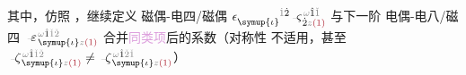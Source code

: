 其中，仿照 ，继续定义 \textcolor{NavyBlue}{磁偶-电四/磁偶} $\epsilon^{\hphantom{\symup{\iota}}\mathcolor{gray}{\dot{1}}\dot{2}}_{\symup{\iota}} \xint{\begin{smallmatrix} ~ \\ {}^{}_{\mathcolor{gray}{-}} \\ ~ \end{smallmatrix}}{13}{\varsigma}^{\;\! \mathcolor{gray}{\omega} \hat{1} \mathcolor{gray}{\check{1}}}_{\;\! \dot{2} \mathcolor{gray}{z} \textcolor{Maroon}{(1)}}$ 与下一阶 \textcolor{NavyBlue}{电偶-电八/磁四} $\xint{\begin{smallmatrix} ~ \\ {}^{}_{\mathcolor{gray}{-}} \\ ~ \end{smallmatrix}}{16}{\varepsilon}^{\;\! \mathcolor{gray}{\omega} \hat{1} \mathcolor{gray}{\check{1} \check{2}}}_{\;\! \symup{\iota} \mathcolor{gray}{z} \textcolor{Maroon}{(1)}}$ 合并\textcolor{Plum}{同类项}后的系数（对称性  不适用，甚至 $\xint{\begin{smallmatrix} ~ \\ {}^{}_{\mathcolor{gray}{-}} \\ ~ \end{smallmatrix}}{12}{\zeta}^{\;\! \mathcolor{gray}{\omega} \hat{1} \mathcolor{gray}{\check{1} \check{2}}}_{\;\! \symup{\iota} \mathcolor{gray}{z} \textcolor{Maroon}{(1)}} \neq \xint{\begin{smallmatrix} ~ \\ {}^{}_{\mathcolor{gray}{-}} \\ ~ \end{smallmatrix}}{12}{\zeta}^{\;\! \mathcolor{gray}{\omega} \hat{1} \mathcolor{gray}{\check{2} \check{1}}}_{\;\! \symup{\iota} \mathcolor{gray}{z} \textcolor{Maroon}{(1)}}$）
